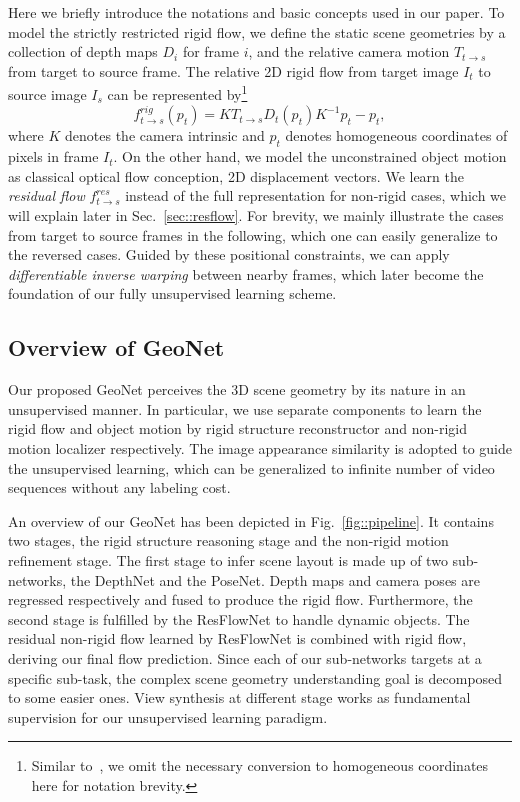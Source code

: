 Here we briefly introduce the notations and basic concepts used in our paper. To model the strictly restricted rigid flow, we define the static scene geometries by a collection of depth maps $D_i$ for frame $i$, and the relative camera motion $T_{t\to s}$ from target to source frame. The relative 2D rigid flow from target image $I_t$ to source image $I_s$ can be represented by\footnote{Similar to~\cite{zhou2017unsupervised}, we omit the necessary conversion to homogeneous coordinates here for notation brevity.}
\begin{equation}
    \label{equa::proj}
f_{t\to s}^{rig}(p_t) = KT_{t\to s}D_t(p_t)K^{-1}p_t - p_t,
\end{equation}
where $K$ denotes the camera intrinsic and $p_t$ denotes homogeneous coordinates of pixels in frame $I_t$. On the other hand, we model the unconstrained object motion as classical optical flow conception, \ie 2D displacement vectors. We learn the \textit{residual flow} $f^{res}_{t\to s}$ instead of the full representation for non-rigid cases, which we will explain later in Sec.~\ref{sec::resflow}. For brevity, we mainly illustrate the cases from target to source frames in the following, which one can easily generalize to the reversed cases. 
Guided by these positional constraints, we can apply \textit{differentiable inverse warping} \cite{JaderbergSZK15} between nearby frames, which later become the foundation of our fully unsupervised learning scheme. 

\subsection{Overview of GeoNet} \label{sec:overview}



Our proposed GeoNet perceives the 3D scene geometry by its nature in an unsupervised manner. In particular, we use separate components to learn the rigid flow and object motion by rigid structure reconstructor and non-rigid motion localizer respectively. The image appearance similarity is adopted to guide the unsupervised learning, which can be generalized to infinite number of video sequences without any labeling cost.

An overview of our GeoNet has been depicted in Fig.~\ref{fig::pipeline}. It contains two stages, the rigid structure reasoning stage and the non-rigid motion refinement stage. The first stage to infer scene layout is made up of two sub-networks, \ie the DepthNet and the PoseNet. Depth maps and camera poses are regressed respectively and fused to produce the rigid flow. Furthermore, the second stage is fulfilled by the ResFlowNet to handle dynamic objects. The residual non-rigid flow learned by ResFlowNet is combined with rigid flow, deriving our final flow prediction. Since each of our sub-networks targets at a specific sub-task, the complex scene geometry understanding goal is decomposed to some easier ones. View synthesis at different stage works as fundamental supervision for our unsupervised learning paradigm. 

